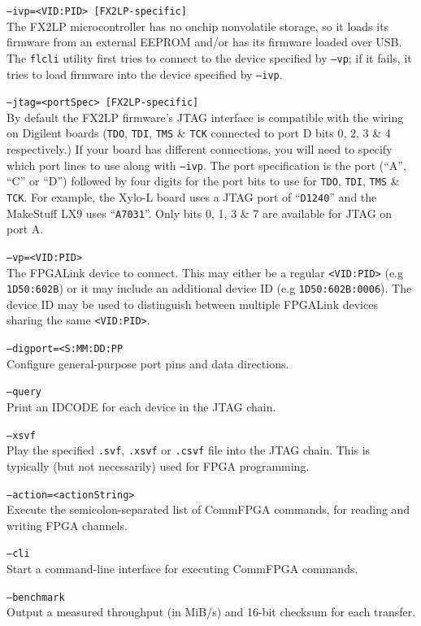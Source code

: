 \begin{desc}
  \item[\texttt{--ivp=<VID:PID> [FX2LP-specific]}] \hfill \\
    The FX2LP microcontroller has no onchip nonvolatile storage, so it loads its firmware from an external EEPROM and/or has its firmware loaded over USB. The \texttt{flcli} utility first tries to connect to the device specified by \texttt{--vp}; if it fails, it tries to load firmware into the device specified by \texttt{--ivp}.
  \item[\texttt{--jtag=<portSpec> [FX2LP-specific]}] \hfill \\
    By default the FX2LP firmware's JTAG interface is compatible with the wiring on Digilent boards (\texttt{TDO}, \texttt{TDI}, \texttt{TMS} \& \texttt{TCK} connected to port D bits 0, 2, 3 \& 4 respectively.) If your board has different connections, you will need to specify which port lines to use along with \texttt{--ivp}. The port specification is the port (``A'', ``C'' or ``D'') followed by four digits for the port bits to use for \texttt{TDO}, \texttt{TDI}, \texttt{TMS} \& \texttt{TCK}. For example, the Xylo-L board uses a JTAG port of ``\texttt{D1240}'' and the MakeStuff LX9 uses ``\texttt{A7031}''. Only bits 0, 1, 3 \& 7 are available for JTAG on port A.
  \item[\texttt{--vp=<VID:PID>}] \hfill \\
    The FPGALink device to connect. This may either be a regular \texttt{<VID:PID>} (e.g \texttt{1D50:602B}) or it may include an additional device ID (e.g \texttt{1D50:602B:0006}). The device ID may be used to distinguish between multiple FPGALink devices sharing the same \texttt{<VID:PID>}.
  \item[\texttt{--digport=<S:MM:DD:PP}] \hfill \\
    Configure general-purpose port pins and data directions.
  \item[\texttt{--query}] \hfill \\
    Print an IDCODE for each device in the JTAG chain.
  \item[\texttt{--xsvf}] \hfill \\
    Play the specified \texttt{.svf}, \texttt{.xsvf} or \texttt{.csvf} file into the JTAG chain. This is typically (but not necessarily) used for FPGA programming.
  \item[\texttt{--action=<actionString>}] \hfill \\
    Execute the semicolon-separated list of CommFPGA commands, for reading and writing FPGA channels.
  \item[\texttt{--cli}] \hfill \\
    Start a command-line interface for executing CommFPGA commands.
  \item[\texttt{--benchmark}] \hfill \\
    Output a measured throughput (in MiB/s) and 16-bit checksum for each transfer.
\end{desc}

